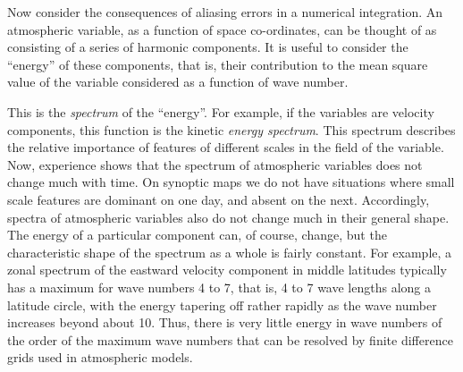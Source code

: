 Now consider the consequences of aliasing errors in a numerical integration. An atmospheric variable, as a function of space co-ordinates, can be thought of as consisting of a series of harmonic components. It is useful to consider the “energy” of these components, that is, their contribution to the mean square value of the variable considered as a function of wave number.

This is the \textit{spectrum} of the “energy”. For example, if the variables are velocity components, this function is the kinetic \textit{energy spectrum}. This spectrum describes the relative importance of features of different scales in the field of the variable. Now, experience shows that the spectrum of atmospheric variables does not change much with time. On synoptic maps we do not have situations where small scale features are dominant on one day, and absent on the next. Accordingly, spectra of atmospheric variables also do not change much in their general shape. The energy of a particular component can, of course, change, but the characteristic shape of the spectrum as a whole is fairly constant. For example, a zonal spectrum of the eastward velocity component in middle latitudes typically has a maximum for wave numbers 4 to 7, that is, 4 to 7 wave lengths along a latitude circle, with the energy tapering off rather rapidly as the wave number increases beyond about 10. Thus, there is very little energy in wave numbers of the order of the maximum wave numbers that can be resolved by finite difference grids used in atmospheric models.

